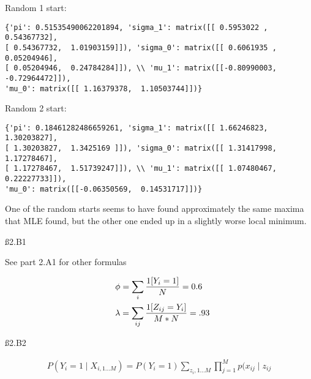 Random 1 start:
\begin{verbatim}
{'pi': 0.51535490062201894, 'sigma_1': matrix([[ 0.5953022 ,  0.54367732],
[ 0.54367732,  1.01903159]]), 'sigma_0': matrix([[ 0.6061935 ,  0.05204946],
[ 0.05204946,  0.24784284]]), \\ 'mu_1': matrix([[-0.80990003, -0.72964472]]),
'mu_0': matrix([[ 1.16379378,  1.10503744]])}
\end{verbatim}

Random 2 start:
\begin{verbatim}
{'pi': 0.18461282486659261, 'sigma_1': matrix([[ 1.66246823,  1.30203827],
[ 1.30203827,  1.3425169 ]]), 'sigma_0': matrix([[ 1.31417998,  1.17278467],
[ 1.17278467,  1.51739247]]), \\ 'mu_1': matrix([[ 1.07480467,  0.22227733]]),
'mu_0': matrix([[-0.06350569,  0.14531717]])}
\end{verbatim}

One of the random starts seems to have found approximately the same maxima that MLE found, but the other one ended up in a slightly worse local minimum.

\ss{2.B1}

See part 2.A1 for other formulas

\begin{align*}
& \phi = \sum_{i}\frac{1[Y_{i}=1]}{N} = 0.6 \\ \hspace{3 mm} &
\lambda = \sum_{ij} \frac{1[Z_{ij}=Y_i]}{M*N} = .93
\end{align*}

\ss{2.B2}

\begin{align*}
P(Y_i=1 \mid X_{i,1\dots M}) = P(Y_i=1) \sum_{z_i,1\dots M} \prod_{j=1}^M p(x_{ij} \mid z_{ij}
\end{align*}

